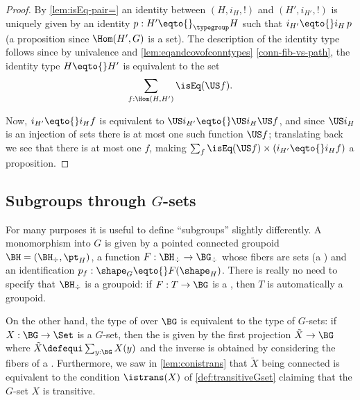\begin{proof}
By \cref{lem:isEq-pair=} an identity between $(H,i_H,!)$ and $(H',i_{H'},!)$ is uniquely given by an identity $p:H'\eqto{}_{\typegroup}H$ such that $i_{H'}\eqto{}i_H\,p$ (a proposition since $\Hom(H',G)$ is a set).
The description of the identity type follows since by univalence and \cref{lem:eqandcovofconntypes} \cref{conn-fib-vs-path}, %
the identity type $H\eqto{}H'$ is equivalent to the set
$$\sum_{f:\Hom(H,H')}\isEq(\US f).$$

Now, $i_{H'}\eqto{}i_Hf$ is equivalent to $\US i_{H'}\eqto{}\US i_H \US f$, and since $\US i_H$ is an injection of sets there is at most one such function $\US f$; translating back we see that there is at most one $f$, making $\sum_{f%
}\isEq(\US f)\times (i_{H'}\eqto{}i_H f)$ a proposition.
\end{proof}

\subsection{Subgroups through $G$-sets}

For many purposes it is useful to define ``subgroups'' slightly differently.
A monomorphism into $G$ is given by a pointed connected groupoid  $\BH=(\BH_\div,\pt_H)$, a function $F:\BH_\div\to\BG_\div$ whose fibers are sets (a \covering) and an identification $p_f:\shape_G\eqto{}F(\shape_H)$.  There is really no need to specify that $\BH_\div$ is a groupoid: if $F:T\to \BG$ is a \covering, then $T$ is automatically a groupoid.

On the other hand,  the type of \coverings over $\BG$ is equivalent to the type of $G$-sets: if $X:\BG\to\Set$ is a $G$-set, then the \covering is given by the first projection $\tilde X\to \BG$ where $\tilde X\defequi\sum_{y:\BG}X(y)$ and the inverse is obtained by considering the fibers of a \covering.  Furthermore, we saw in \cref{lem:conistrans} that $\tilde X$ being connected is equivalent to the condition $\istrans(X)$ of \cref{def:transitiveGset} claiming that the $G$-set $X$ is transitive.

